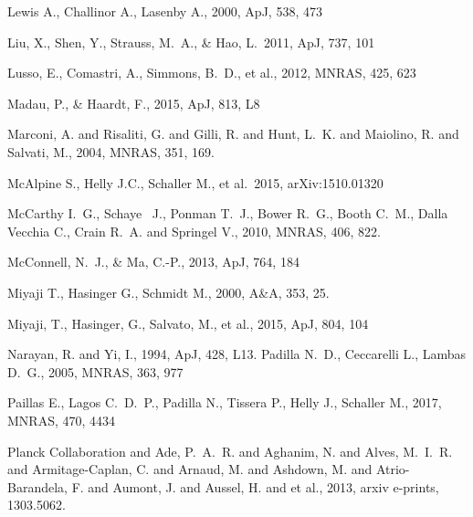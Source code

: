 \documentclass[a4paper,fleqn,usenatbib,letter]{mnras}
\begin{document}
\begin{thebibliography}{99}
Lewis A., Challinor A., Lasenby A., 2000, ApJ, 538, 473

Liu, X., Shen, Y., Strauss, M.~A., \& Hao, L.\ 2011, ApJ, 737, 101 


Lusso, E., Comastri, A., Simmons, B.~D., et al., 2012, MNRAS, 425, 623 

 
Madau, P., \& Haardt, F., 2015, ApJ, 813, L8 


{Marconi}, A. and {Risaliti}, G. and {Gilli}, R. and {Hunt}, L.~K. and 
{Maiolino}, R. and {Salvati}, M., 2004, MNRAS, 351, 169.   


McAlpine S., Helly J.C., Schaller M., et al.\ 2015, arXiv:1510.01320

McCarthy  I.~G., Schaye ~J., Ponman T.~J., Bower R.~G., Booth C.~M., Dalla Vecchia C., Crain R.~A. and Springel V.,
2010, MNRAS,  406, 822.


McConnell, N.~J., \& Ma, C.-P., 2013, ApJ, 764, 184 



{Miyaji} T.,  {Hasinger} G., {Schmidt} M.,  2000, A\&A, 353, 25.


Miyaji, T., Hasinger, G., Salvato, M., et al., 2015, ApJ, 804, 104


{Narayan}, R. and {Yi}, I., 1994,  ApJ, 428, L13.
Padilla N.~D., Ceccarelli L., Lambas D.~G., 2005, MNRAS, 363, 977

Paillas E., Lagos C.~D.~P., Padilla N., Tissera P., Helly J., Schaller M., 2017, MNRAS, 470, 4434


{Planck Collaboration} and {Ade}, P.~A.~R. and {Aghanim}, N. and 
	{Alves}, M.~I.~R. and {Armitage-Caplan}, C. and {Arnaud}, M. and 
	{Ashdown}, M. and {Atrio-Barandela}, F. and {Aumont}, J. and 
	{Aussel}, H. and et al., 2013, arxiv e-prints, 1303.5062.


\end{thebibliography}
\end{document}
